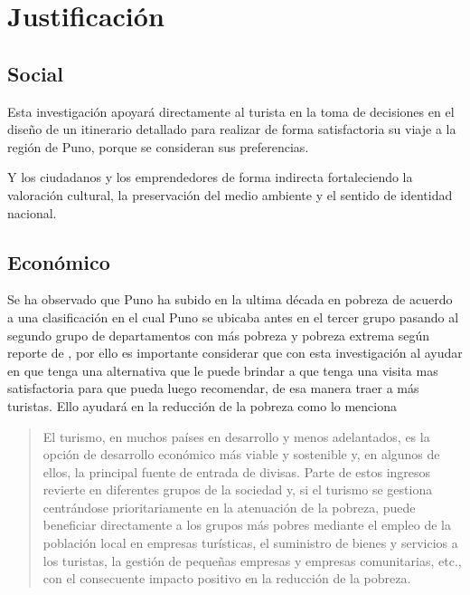 \section{Justificación}
\subsection{Social}
Esta investigación apoyará directamente al turista en la toma de decisiones en el diseño de un itinerario detallado para realizar de forma satisfactoria su viaje a la región de Puno, porque se consideran sus preferencias. 

Y los ciudadanos y los emprendedores de forma indirecta fortaleciendo la valoración cultural, la preservación del medio ambiente y el sentido de identidad nacional. 
\subsection{Económico}

Se ha observado que Puno ha subido en la ultima década en pobreza de acuerdo a una clasificación en el cual Puno se ubicaba antes en el tercer grupo pasando al segundo grupo de departamentos con más pobreza y pobreza extrema según reporte de , por ello es importante considerar que con esta investigación al ayudar en que tenga una alternativa que le puede brindar a que tenga una visita mas satisfactoria para que pueda luego recomendar, de esa manera traer a más turistas. Ello ayudará en la reducción de la pobreza como lo menciona 
\begin{quote} El turismo, en muchos países en desarrollo y menos adelantados, es la opción de desarrollo económico más viable y sostenible y, en algunos de ellos, la principal fuente de entrada de divisas. Parte de estos ingresos revierte en diferentes grupos de la sociedad y, si el turismo se gestiona centrándose prioritariamente en la atenuación de la pobreza, puede beneficiar directamente a los grupos más pobres mediante el empleo de la población local en empresas turísticas, el suministro de bienes y servicios a los turistas, la gestión de pequeñas empresas y empresas comunitarias, etc., con el consecuente impacto positivo en la reducción de la pobreza.\end{quote} 
